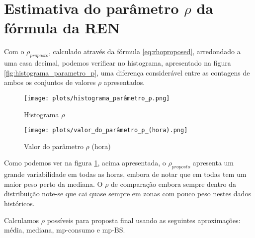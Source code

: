\section{Estimativa do parâmetro $\rho$ da fórmula da REN}


Com o $\rho_{proposto}$, calculado através da fórmula \ref{eq:rhoproposed}, arredondado a uma casa decimal, podemos verificar no histograma, apresentado na figura \ref{fig:histograma_parametro_p}, uma diferença considerável entre as contagens de ambos os conjuntos de valores $\rho$ apresentados.\par





\begin{figure}[H]
    \centering
    \begin{minipage}[b]{0.49\textwidth}
        \centering
        \texttt{[image: plots/histograma\_parâmetro\_ρ.png]}
        \caption{Histograma $\rho$}
        \label{fig:histograma_parametro_p}
    \end{minipage}
    \begin{minipage}[b]{0.49\textwidth}
        \centering
        \texttt{[image: plots/valor\_do\_parâmetro\_ρ\_(hora).png]}
        \caption{Valor do parâmetro $\rho$ (hora)}
        \label{fig:valor_do_parametro_ρ_hora}
    \end{minipage}
\end{figure}

Como podemos ver na figura \ref{fig:valor_do_parametro_ρ_hora}, acima apresentada, o $\rho_{proposto}$ apresenta um grande variabilidade em todas as horas, embora de notar que em todas tem um maior peso perto da mediana. O $\rho$ de comparação embora sempre dentro da distribuição note-se que cai quase sempre em zonas com pouco peso nestes dados históricos.\par
Calculamos $\rho$ possíveis para proposta final usando as seguintes aproximações: média, mediana, \gls{mp-consumo} e \gls{mp-BS}.\par

